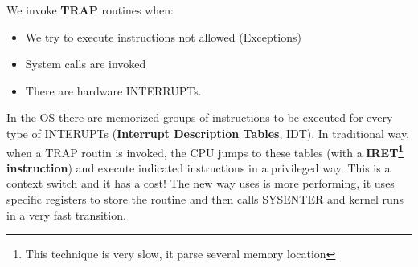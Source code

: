 We invoke \textbf{TRAP} routines when:
\begin{itemize}
    \item We try to execute instructions not allowed (Exceptions)
    \item System calls are invoked
    \item There are hardware INTERRUPTs.
\end{itemize}
In the OS there are memorized groups of instructions to be executed for every type of INTERUPTs (\textbf{Interrupt Description Tables}, IDT). In traditional way, when a TRAP routin is invoked, the CPU jumps to these tables (with a \textbf{IRET\footnote{This technique is very slow, it parse several memory location} instruction}) and execute indicated instructions in a privileged way. This is a context switch and it has a cost! The new way uses is more performing, it uses specific registers to store the routine and then calls SYSENTER and kernel runs in a very fast transition.

